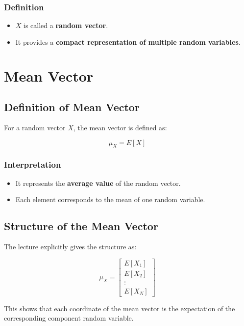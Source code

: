 \documentclass[12pt]{article}
\begin{document}
\subsubsection*{Definition}

\begin{itemize}
    \item \(X\) is called a \textbf{random vector}.
    \item It provides a \textbf{compact representation of multiple random variables}.
\end{itemize}

\section{Mean Vector}

\subsection{Definition of Mean Vector}

For a random vector \(X\), the mean vector is defined as:

\[
\mu_X = E[X]
\]

\subsubsection*{Interpretation}

\begin{itemize}
    \item It represents the \textbf{average value} of the random vector.
    \item Each element corresponds to the mean of one random variable.
\end{itemize}

\subsection{Structure of the Mean Vector}

The lecture explicitly gives the structure as:

\[
\mu_X =
\begin{bmatrix}
E[X_1] \\
E[X_2] \\
\vdots \\
E[X_N]
\end{bmatrix}
\]

This shows that each coordinate of the mean vector is the expectation of the corresponding component random variable.
\end{document}

